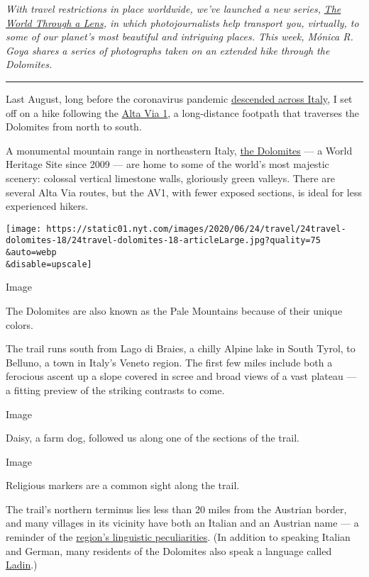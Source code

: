 \emph{With travel restrictions in place worldwide, we've launched a new
series,}
\href{https://www.nytimes.com/column/the-world-through-a-lens}{\emph{The
World Through a Lens}}\emph{, in which photojournalists help transport
you, virtually, to some of our planet's most beautiful and intriguing
places. This week, Mónica R. Goya shares a series of photographs taken
on an extended hike through the Dolomites.}

\begin{center}\rule{0.5\linewidth}{\linethickness}\end{center}

Last August, long before the coronavirus pandemic
\href{https://www.nytimes.com/2020/03/21/world/europe/italy-coronavirus-center-lessons.html}{descended
across Italy}, I set off on a hike following the
\href{https://www.alpineexploratory.com/walking-guides/alta-via-1.html}{Alta
Via 1}, a long-distance footpath that traverses the Dolomites from north
to south.

A monumental mountain range in northeastern Italy,
\href{https://www.nytimes.com/2018/08/30/travel/what-to-do-in-the-dolomites.html}{the
Dolomites} --- a World Heritage Site since 2009 --- are home to some of
the world's most majestic scenery: colossal vertical limestone walls,
gloriously green valleys. There are several Alta Via routes, but the
AV1, with fewer exposed sections, is ideal for less experienced hikers.

\texttt{[image: https://static01.nyt.com/images/2020/06/24/travel/24travel-dolomites-18/24travel-dolomites-18-articleLarge.jpg?quality=75\\\&auto=webp\\\&disable=upscale]}

Image

The Dolomites are also known as the Pale Mountains because of their
unique colors.

The trail runs south from Lago di Braies, a chilly Alpine lake in South
Tyrol, to Belluno, a town in Italy's Veneto region. The first few miles
include both a ferocious ascent up a slope covered in scree and broad
views of a vast plateau --- a fitting preview of the striking contrasts
to come.

Image

Daisy, a farm dog, followed us along one of the sections of the trail.

Image

Religious markers are a common sight along the trail.

The trail's northern terminus lies less than 20 miles from the Austrian
border, and many villages in its vicinity have both an Italian and an
Austrian name --- a reminder of the
\href{https://www.nytimes.com/2014/03/25/world/europe/italys-historic-multicultural-compromise.html}{region's
linguistic peculiarities}. (In addition to speaking Italian and German,
many residents of the Dolomites also speak a language called
\href{https://www.altabadia.org/en/italian-alps-dolomites/about-alta-badia/the-ladin-language-and-culture.html}{Ladin}.)


